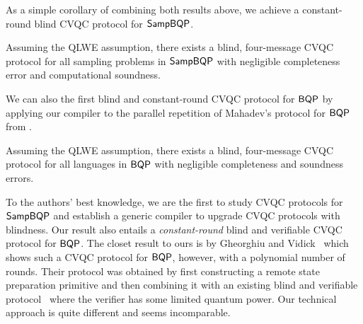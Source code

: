 As a simple corollary of combining both results above, we achieve a constant-round blind CVQC protocol for $\operatorname{\mathsf{SampBQP}}$. %
\begin{theorem}[informal]
		Assuming the QLWE assumption, there exists a blind, four-message CVQC protocol for all sampling problems in $\operatorname{\mathsf{SampBQP}}$ with negligible completeness error and computational soundness.
\end{theorem}

We can also the first blind and constant-round CVQC protocol for $\operatorname{\mathsf{BQP}}$ by applying our compiler to the parallel repetition of Mahadev's protocol for $\operatorname{\mathsf{BQP}}$ from \cite{arXiv:ChiaChungYam19, arXiv:AlaChiHun19}.


\begin{theorem}[informal]
	Assuming the QLWE assumption, there exists a blind, four-message CVQC protocol for all languages in $\operatorname{\mathsf{BQP}}$ with negligible completeness and soundness errors.
\end{theorem}




To the authors' best knowledge, we are the first to study CVQC protocols for $\operatorname{\mathsf{SampBQP}}$ and establish a generic compiler to upgrade CVQC protocols with blindness. 
Our result also entails a \emph{constant-round} blind and verifiable CVQC protocol for $\operatorname{\mathsf{BQP}}$. 
The closet result to ours is by Gheorghiu and Vidick~\cite{FOCS:GheVid19} which shows such a CVQC protocol for $\operatorname{\mathsf{BQP}}$, however, with a polynomial number of rounds. 
Their protocol was obtained by first constructing a remote state preparation primitive and then combining it with an existing blind and verifiable protocol~\cite{FK17} where the verifier has some limited quantum power. 
Our technical approach is quite different and seems incomparable. 


